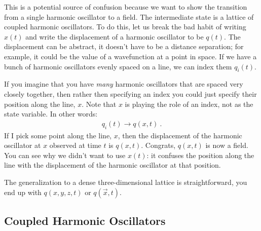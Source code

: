 This is a potential source of confusion because we want to show the transition from a single harmonic oscillator to a field. The intermediate state is a lattice of coupled harmonic oscillators. To do this, let us break the bad habit of writing $x(t)$ and write the displacement of a harmonic oscillator to be $q(t)$. The displacement can be abstract, it doesn't have to be a distance separation; for example, it could be the value of a wavefunction at a point in space. If we have a bunch of harmonic oscillators evenly spaced on a line, we can index them $q_i(t)$. 

If you imagine that you have \emph{many} harmonic oscillators that are spaced very closely together, then rather then specifying an index you could just specify their position along the line, $x$. Note that $x$ is playing the role of an index, not as the state variable. In other words:
\begin{align}
	q_i(t) \to q(x,t) \ .
\end{align}
If I pick some point along the line, $x$, then the displacement of the harmonic oscillator at $x$ observed at time $t$ is $q(x,t)$. Congrats, $q(x,t)$ is now a field. You can see why we didn't want to use $x(t)$: it confuses the position along the line with the displacement of the harmonic oscillator at that position. 

The generalization to a dense three-dimensional lattice is straightforward, you end up with $q(x,y,z,t)$ or $q(\vec{x},t)$.


\subsection{Coupled Harmonic Oscillators}

